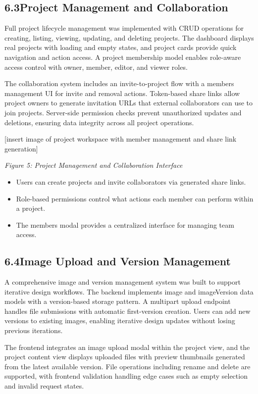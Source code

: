 \documentclass[12pt,a4paper]{article}
\begin{document}
\subsection{6.3\quad Project Management and Collaboration}

Full project lifecycle management was implemented with CRUD operations for creating, listing, viewing, updating, and deleting projects. The dashboard displays real projects with loading and empty states, and project cards provide quick navigation and action access. A project membership model enables role-aware access control with owner, member, editor, and viewer roles.

The collaboration system includes an invite-to-project flow with a members management UI for invite and removal actions. Token-based share links allow project owners to generate invitation URLs that external collaborators can use to join projects. Server-side permission checks prevent unauthorized updates and deletions, ensuring data integrity across all project operations.

[insert image of project workspace with member management and share link generation]

\textit{Figure 5: Project Management and Collaboration Interface}

\begin{itemize}
    \item Users can create projects and invite collaborators via generated share links.
    \item Role-based permissions control what actions each member can perform within a project.
    \item The members modal provides a centralized interface for managing team access.
\end{itemize}

\subsection{6.4\quad Image Upload and Version Management}

A comprehensive image and version management system was built to support iterative design workflows. The backend implements image and imageVersion data models with a version-based storage pattern. A multipart upload endpoint handles file submissions with automatic first-version creation. Users can add new versions to existing images, enabling iterative design updates without losing previous iterations.

The frontend integrates an image upload modal within the project view, and the project content view displays uploaded files with preview thumbnails generated from the latest available version. File operations including rename and delete are supported, with frontend validation handling edge cases such as empty selection and invalid request states.
\end{document}
